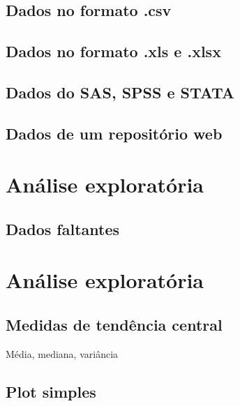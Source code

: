 \documentclass[
]{book}
\begin{document}
\hypertarget{dados-no-formato-.csv}{%
\subsection{Dados no formato .csv}\label{dados-no-formato-.csv}}

\hypertarget{dados-no-formato-.xls-e-.xlsx}{%
\subsection{Dados no formato .xls e .xlsx}\label{dados-no-formato-.xls-e-.xlsx}}

\hypertarget{dados-do-sas-spss-e-stata}{%
\subsection{Dados do SAS, SPSS e STATA}\label{dados-do-sas-spss-e-stata}}

\hypertarget{dados-de-um-reposituxf3rio-web}{%
\subsection{Dados de um repositório web}\label{dados-de-um-reposituxf3rio-web}}

\hypertarget{anuxe1lise-exploratuxf3ria}{%
\section{Análise exploratória}\label{anuxe1lise-exploratuxf3ria}}

\hypertarget{dados-faltantes}{%
\subsection{Dados faltantes}\label{dados-faltantes}}

\hypertarget{anuxe1lise-exploratuxf3ria-1}{%
\section{Análise exploratória}\label{anuxe1lise-exploratuxf3ria-1}}

\hypertarget{medidas-de-tenduxeancia-central}{%
\subsection{Medidas de tendência central}\label{medidas-de-tenduxeancia-central}}

Média, mediana, variância

\hypertarget{plot-simples}{%
\subsection{Plot simples}\label{plot-simples}}
\end{document}
